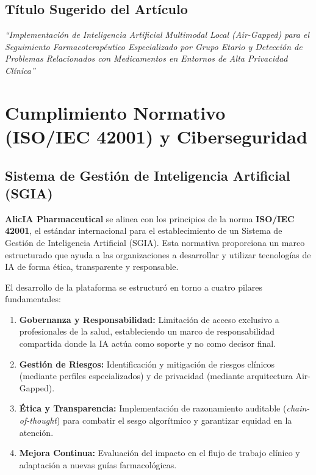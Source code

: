 \documentclass[12pt,a4paper]{article}
\begin{document}
\subsection{Título Sugerido del Artículo}

\begin{infobox}
  \centering\itshape
  ``Implementación de Inteligencia Artificial Multimodal Local (Air-Gapped) para el
  Seguimiento Farmacoterapéutico Especializado por Grupo Etario y Detección de Problemas
  Relacionados con Medicamentos en Entornos de Alta Privacidad Clínica''
\end{infobox}

\newpage

\section{Cumplimiento Normativo (ISO/IEC 42001) y Ciberseguridad}

\subsection{Sistema de Gestión de Inteligencia Artificial (SGIA)}

\textbf{AlicIA Pharmaceutical} se alinea con los principios de la norma \textbf{ISO/IEC 42001}, el estándar internacional para el establecimiento de un Sistema de Gestión de Inteligencia Artificial (SGIA). Esta normativa proporciona un marco estructurado que ayuda a las organizaciones a desarrollar y utilizar tecnologías de IA de forma ética, transparente y responsable.

El desarrollo de la plataforma se estructuró en torno a cuatro pilares fundamentales:
\begin{enumerate}
  \item \textbf{Gobernanza y Responsabilidad:} Limitación de acceso exclusivo a profesionales de la salud, estableciendo un marco de responsabilidad compartida donde la IA actúa como soporte y no como decisor final.
  \item \textbf{Gestión de Riesgos:} Identificación y mitigación de riesgos clínicos (mediante perfiles especializados) y de privacidad (mediante arquitectura Air-Gapped).
  \item \textbf{Ética y Transparencia:} Implementación de razonamiento auditable (\textit{chain-of-thought}) para combatir el sesgo algorítmico y garantizar equidad en la atención.
  \item \textbf{Mejora Continua:} Evaluación del impacto en el flujo de trabajo clínico y adaptación a nuevas guías farmacológicas.
\end{enumerate}
\end{document}
